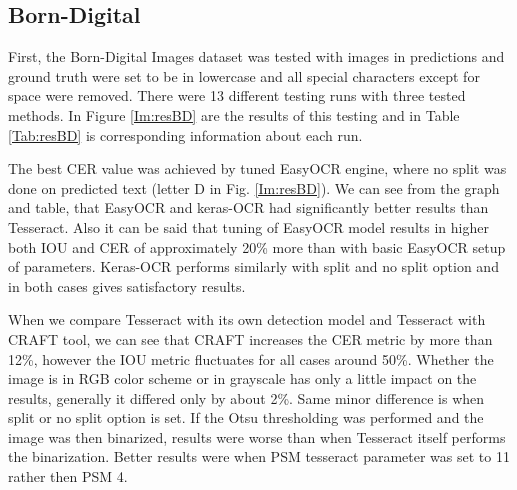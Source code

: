 \subsection*{Born-Digital}

First, the Born-Digital Images dataset was tested with images in predictions and ground truth were set to be in lowercase and all special characters except for space were removed. There were 13 different testing runs with three tested methods.  In Figure \ref*{Im:resBD} are the results of this testing and in Table \ref*{Tab:resBD} is corresponding information about each run. 

The best CER value was achieved by tuned EasyOCR engine, where no split was done on predicted text (letter D in Fig. \ref*{Im:resBD}). We can see from the graph and table, that EasyOCR and keras-OCR had significantly better results than Tesseract. Also it can be said that tuning of EasyOCR model results in higher both IOU and CER of approximately 20\% more than with basic EasyOCR setup of parameters. Keras-OCR performs similarly with split and no split option and in both cases gives satisfactory results.

When we compare Tesseract with its own detection model and Tesseract with CRAFT tool, we can see that CRAFT increases the CER metric by more than 12\%, however the IOU metric fluctuates for all cases around 50\%. Whether the image is in RGB color scheme or in grayscale has only a little impact on the results, generally it differed only by about 2\%. Same minor difference is when split or no split option is set. If the Otsu thresholding was performed and the image was then binarized, results were worse than when Tesseract itself performs the binarization. Better results were when PSM tesseract parameter was set to 11 rather then PSM 4.

